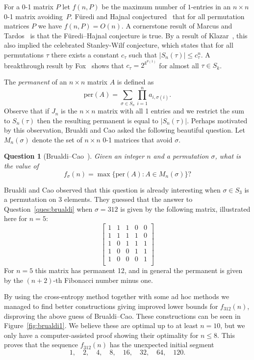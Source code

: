 \documentclass[11pt,english]{article}
\theoremstyle{plain}
\newtheorem{question}[theorem]{Question}
\theoremstyle{remark}
\begin{document}
 For a 0-1 matrix $P$ let $f(n, P)$ be the maximum number of $1$-entries in an $n \times n$ 0-1 matrix avoiding~$P$. F\"uredi and Hajnal conjectured~\cite{furedihajnal} that for all permutation matrices $P$ we have $f(n, P)= O(n)$. A cornerstone result of Marcus and Tardos~\cite{marcustardos} is that the F\"uredi--Hajnal conjecture is true. By a result of Klazar~\cite{klazar}, this also implied the celebrated Stanley-Wilf conjecture, which states that for all permutations $\tau$ there exists a constant $c_\tau$ such that $|S_n(\tau)|\leq c_\tau^n$. A breakthrough result by Fox~\cite{fox} shows that $c_\tau=2^{k^{\theta(1)}}$ for almost all $\tau\in S_k$. 
 
 The \emph{permanent} of an $n\times n$ matrix $A$ is defined as
 $$\text{per}(A)=\sum_{\sigma \in S_n}\prod_{i=1}^n a_{i,\sigma(i)}.$$
 Observe that if $J_n$ is the $n\times n$ matrix with all 1 entries and we restrict the sum to $S_n(\tau)$ then the resulting permanent is equal to $|S_n(\tau)|$. Perhaps motivated by this observation, Brualdi and Cao asked the following beautiful question.  Let $M_n(\sigma)$ denote the set of $n\times n$ 0-1 matrices that avoid $\sigma$.
 \begin{question}[\label{ques:brualdi}Brualdi--Cao~\cite{brualdi}]
Given an integer $n$ and a permutation $\sigma$, what is the value of $$f_\sigma(n)=\max\{\text{per}(A) : A \in M_n(\sigma)\}?$$
 \end{question}
 
Brualdi and Cao observed that this question is already interesting when $\sigma\in S_3$ is a permutation on 3 elements. They guessed that the answer to Question~\ref{ques:brualdi} when $\sigma=312$ is given by the following matrix, illustrated here for $n=5$:
$$\begin{bmatrix}
1 & 1 & 1 & 0 & 0 \\
1 & 1 & 1 & 1 & 0 \\
1 & 0 & 1 & 1 & 1 \\
1 & 0 & 0 & 1 & 1 \\
1 & 0 & 0 & 0 & 1 \\
\end{bmatrix}$$
For $n=5$ this matrix has permanent 12, and in general the permanent is given by the $(n+2)$-th Fibonacci number minus one.

By using the cross-entropy method together with some ad hoc methods we managed to find better constructions giving improved lower bounds for $f_{312}(n)$, disproving the above guess of Brualdi--Cao.  These constructions can be seen in Figure~\ref{fig:brualdi1}. We believe these are optimal up to at least $n= 10$, but we only have a computer-assisted proof showing their optimality for $n\leq 8$. This proves that the sequence $f_{312}(n)$ has the unexpected initial segment
$$1,\quad 2,\quad 4,\quad 8,\quad 16,\quad 32,\quad 64,\quad 120.$$
\end{document}
